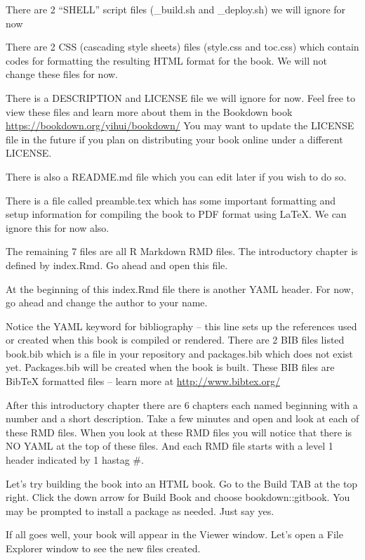 \documentclass[]{book}
\theoremstyle{definition}
\theoremstyle{definition}
\theoremstyle{definition}
\theoremstyle{remark}
\begin{document}
There are 2 ``SHELL'' script files (\_build.sh and \_deploy.sh) we will
ignore for now

There are 2 CSS (cascading style sheets) files (style.css and toc.css)
which contain codes for formatting the resulting HTML format for the
book. We will not change these files for now.

There is a DESCRIPTION and LICENSE file we will ignore for now. Feel
free to view these files and learn more about them in the Bookdown book
\url{https://bookdown.org/yihui/bookdown/} You may want to update the
LICENSE file in the future if you plan on distributing your book online
under a different LICENSE.

There is also a README.md file which you can edit later if you wish to
do so.

There is a file called preamble.tex which has some important formatting
and setup information for compiling the book to PDF format using LaTeX.
We can ignore this for now also.

The remaining 7 files are all R Markdown RMD files. The introductory
chapter is defined by index.Rmd. Go ahead and open this file.

At the beginning of this index.Rmd file there is another YAML header.
For now, go ahead and change the author to your name.

Notice the YAML keyword for bibliography -- this line sets up the
references used or created when this book is compiled or rendered. There
are 2 BIB files listed book.bib which is a file in your repository and
packages.bib which does not exist yet. Packages.bib will be created when
the book is built. These BIB files are BibTeX formatted files -- learn
more at \url{http://www.bibtex.org/}

After this introductory chapter there are 6 chapters each named
beginning with a number and a short description. Take a few minutes and
open and look at each of these RMD files. When you look at these RMD
files you will notice that there is NO YAML at the top of these files.
And each RMD file starts with a level 1 header indicated by 1 hastag \#.

Let's try building the book into an HTML book. Go to the Build TAB at
the top right. Click the down arrow for Build Book and choose
bookdown::gitbook. You may be prompted to install a package as needed.
Just say yes.

If all goes well, your book will appear in the Viewer window. Let's open
a File Explorer window to see the new files created.
\end{document}
